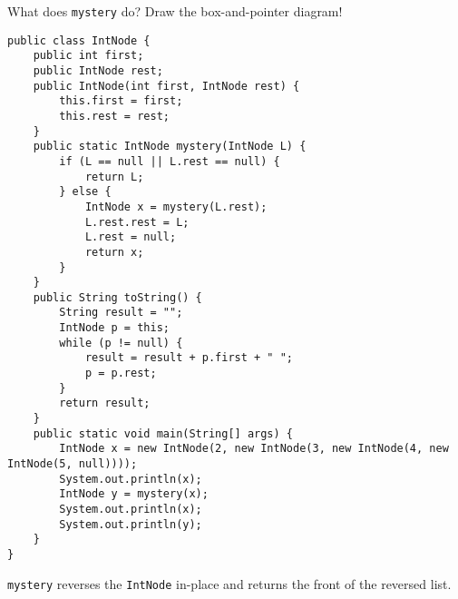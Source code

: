 \question What does \lstinline$mystery$ do? Draw the box-and-pointer diagram!

\begin{lstlisting}
public class IntNode {
    public int first;
    public IntNode rest;
    public IntNode(int first, IntNode rest) {
        this.first = first;
        this.rest = rest;
    }
    public static IntNode mystery(IntNode L) {
        if (L == null || L.rest == null) {
            return L;
        } else {
            IntNode x = mystery(L.rest);
            L.rest.rest = L;
            L.rest = null;
            return x;
        }
    }
    public String toString() {
        String result = "";
        IntNode p = this;
        while (p != null) {
            result = result + p.first + " ";
            p = p.rest;
        }
        return result;
    }
    public static void main(String[] args) {
        IntNode x = new IntNode(2, new IntNode(3, new IntNode(4, new IntNode(5, null))));
        System.out.println(x);
        IntNode y = mystery(x);
        System.out.println(x);
        System.out.println(y);
    }
}
\end{lstlisting}



\begin{solution}
\pagebreak
\clearpage
\lstinline$mystery$ reverses the \lstinline$IntNode$ in-place and returns the front of the reversed list. 

\clearpage
\pagebreak

\end{solution}
